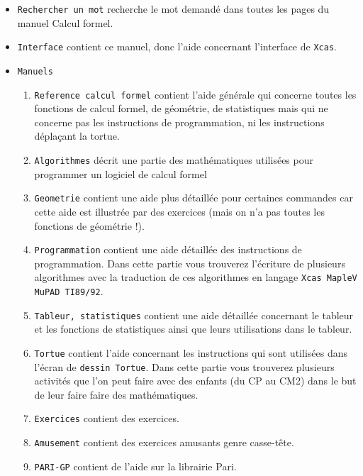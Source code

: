 \documentclass[a4paper,11pt]{article}
\begin{document}
\begin{itemize}
Notez qu'en tapant sur le bouton  situ\'e \`a c\^ot\'e de 
, on ouvre l'{\tt Index} et,
notez aussi qu'en tapant le d\'ebut d'une commande dans une ligne de 
commandes puis sur la touche de tabulation ou sur le bouton  ,
on ouvre l'{\tt Index} \`a la commande commen\c{c}ant par ce d\'ebut.
\item
{\tt Rechercher un mot}
recherche le mot demand\'e dans toutes les pages du manuel Calcul formel.
\item
{\tt Interface}
contient ce manuel, donc l'aide concernant l'interface de {\tt Xcas}.
\item
{\tt Manuels}
\begin{enumerate}
\item
{\tt Reference calcul formel}
contient l'aide g\'en\'erale qui concerne toutes les fonctions de calcul 
formel, de g\'eom\'etrie, de statistiques mais qui ne concerne pas les 
instructions de programmation, ni les instructions d\'epla\c{c}ant la
tortue.
\item {\tt Algorithmes}
d\'ecrit une partie des math\'ematiques utilis\'ees pour programmer
un logiciel de calcul formel
\item
{\tt Geometrie}
contient une aide plus d\'etaill\'ee pour certaines commandes car cette aide 
est illustr\'ee par des exercices (mais on n'a pas toutes les fonctions de 
g\'eom\'etrie !). 
\item
{\tt Programmation}
contient une aide d\'etaill\'ee des instructions de programmation.
Dans cette partie vous trouverez l'\'ecriture de plusieurs algorithmes avec
la traduction de ces algorithmes en langage {\tt Xcas MapleV MuPAD TI89/92}.
\item
{\tt Tableur, statistiques}
contient une aide d\'etaill\'ee concernant le tableur et les fonctions de 
statistiques ainsi que leurs utilisations dans le tableur.
\item
{\tt Tortue}
contient l'aide concernant les instructions qui sont utilis\'ees dans 
l'\'ecran de {\tt dessin Tortue}.
Dans cette partie vous trouverez plusieurs activit\'es que l'on peut faire 
avec des enfants (du CP au CM2) dans le but de leur faire faire des
math\'ematiques.
\item
{\tt Exercices} contient des exercices.
\item
{\tt Amusement} contient des exercices amusants genre casse-t\^ete.
\item
{\tt PARI-GP} contient de l'aide sur la librairie Pari.
\end{enumerate}

\end{itemize}
\end{document}
